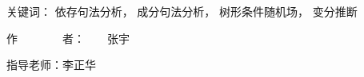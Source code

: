 
\begin{cabstract}

    \vskip 21bp
        {\heiti{} 关键词：}
    依存句法分析，
    成分句法分析，
    树形条件随机场，
    变分推断

    \begin{flushright}
        作~~~~~~~~者：~~~~张宇

        指导老师：李正华

    \end{flushright}


\end{cabstract}


